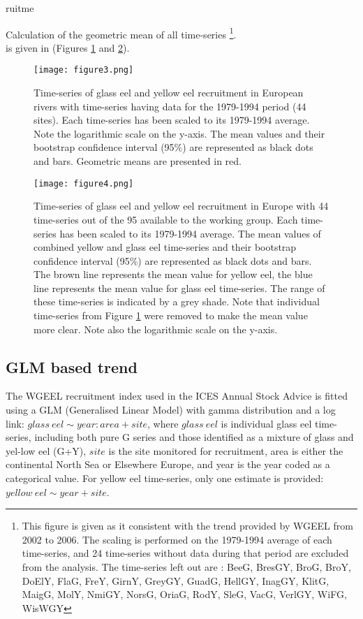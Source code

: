 ruitme\documentclass[pdftex,11pt,a4paper]{report}
\begin{document}
Calculation of the geometric mean of all time-series \footnote{This figure is given as it
consistent with the trend provided by WGEEL from 2002 to 2006. The scaling is
performed on the 1979-1994 average of each time-series, and 24 time-series without data during that
period are excluded from the analysis. The time-series left out are :
BeeG, BresGY, BroG, BroY, DoElY, FlaG, FreY, GirnY, GreyGY, GuadG, HellGY, InagGY, KlitG, MaigG, MolY, NmiGY, NorsG, OriaG, RodY, SleG, VacG, VerlGY, WiFG, WisWGY}. \\
 is given in (Figures
\ref{figure3} and \ref{figure4}). 

\begin{figure}[htbp]
\centering
\texttt{[image: figure3.png]}
\caption{Time-series of glass eel and yellow eel recruitment in European rivers
with time-series having data for the 1979-1994 period
(44 sites).
Each time-series has been scaled to its 1979-1994 average. Note the logarithmic scale
on the y-axis. The mean values and their bootstrap confidence interval (95\%) are represented as
black dots and bars. Geometric means are presented in red.}
\label{figure3}
\end{figure}

\begin{figure}[htbp]
\centering
\texttt{[image: figure4.png]}
\caption{Time-series of glass eel and yellow eel recruitment in Europe
with 44 time-series out of the 95
available to the working group. Each time-series has been scaled to its 1979-1994 average. 
The mean values of combined yellow and glass eel time-series and their bootstrap 
confidence interval (95\%) are represented as black dots and bars.
 The brown line represents the mean value for yellow eel, the blue line represents the mean value for glass eel time-series.
 The range of  these  time-series  is  indicated  by  a  grey  shade.  Note that
 individual time-series  from  Figure \ref{figure3}  were  removed to make the
 mean value more clear.  Note also the logarithmic scale on the y-axis.}
\label{figure4}
\end{figure}


\subsection{GLM based trend}

The WGEEL recruitment index used in the ICES Annual Stock Advice is fitted using
a GLM (Generalised Linear Model) with gamma distribution and a log link:
$glass~eel \sim year:area + site $, where $glass~eel$ is individual glass eel
time-series, including both pure G series and those identified as a mixture of
glass and yel-low eel (G+Y), $site$ is the site monitored for recruitment,
area is either the continental North Sea or Elsewhere Europe, and year is the
year coded as a categorical value.
For yellow eel time-series, only one estimate is provided:
$yellow~eel \sim year + site $. 
\end{document}
